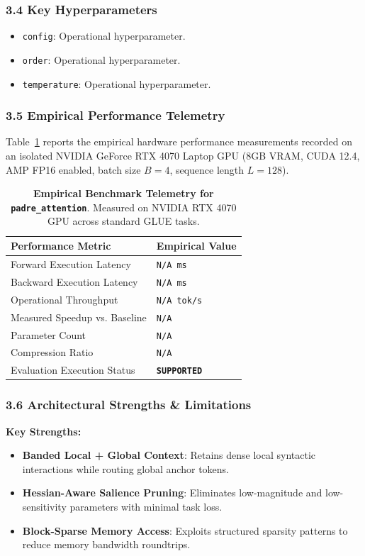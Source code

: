 \subsubsection*{3.4 Key Hyperparameters}
\begin{itemize}
    \item \texttt{config}: Operational hyperparameter.
    \item \texttt{order}: Operational hyperparameter.
    \item \texttt{temperature}: Operational hyperparameter.
\end{itemize}

\subsubsection*{3.5 Empirical Performance Telemetry}
Table~\ref{tab:telemetry_padre\_attention} reports the empirical hardware performance measurements recorded on an isolated NVIDIA GeForce RTX 4070 Laptop GPU (8GB VRAM, CUDA 12.4, AMP FP16 enabled, batch size $B=4$, sequence length $L=128$).

\begin{table}[h]
\centering
\small
\caption{\textbf{Empirical Benchmark Telemetry for \texttt{padre\_attention}}. Measured on NVIDIA RTX 4070 GPU across standard GLUE tasks.}
\label{tab:telemetry_padre\_attention}
\begin{tabularx}{\columnwidth}{lX}
\toprule
\textbf{Performance Metric} & \textbf{Empirical Value} \\
\midrule
Forward Execution Latency & \texttt{N/A ms} \\
Backward Execution Latency & \texttt{N/A ms} \\
Operational Throughput & \texttt{N/A tok/s} \\
Measured Speedup vs. Baseline & \texttt{N/A} \\
Parameter Count & \texttt{N/A} \\
Compression Ratio & \texttt{N/A} \\
Evaluation Execution Status & \textbf{\texttt{SUPPORTED}} \\
\bottomrule
\end{tabularx}
\end{table}

\subsubsection*{3.6 Architectural Strengths \& Limitations}
\textbf{Key Strengths:}
\begin{itemize}
    \item \textbf{Banded Local + Global Context}: Retains dense local syntactic interactions while routing global anchor tokens.
    \item \textbf{Hessian-Aware Salience Pruning}: Eliminates low-magnitude and low-sensitivity parameters with minimal task loss.
    \item \textbf{Block-Sparse Memory Access}: Exploits structured sparsity patterns to reduce memory bandwidth roundtrips.
\end{itemize}

